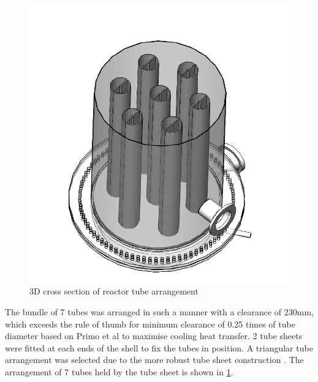 \begin{figure}
    \centering
    \includegraphics[width=\linewidth]{chapters/2-reaction/figures/FYD reactor 7 tubes cross section 3D.PNG}
    \caption{3D cross section of reactor tube arrangement}
    \label{fig:reactortubearrangement}
\end{figure}
The bundle of 7 tubes was arranged in such a manner with a clearance of 230mm, which exceeds the rule of thumb for minimum clearance of 0.25 times of tube diameter based on Primo et al \cite{primo_shell_2012} to maximise cooling heat transfer. 2 tube sheets were fitted at each ends of the shell to fix the tubes in position. A triangular tube arrangement was selected due to the more robust tube sheet construction \cite{primo_shell_2012}.  The arrangement of 7 tubes held by the tube sheet is shown in \cref{fig:reactortubearrangement}.


